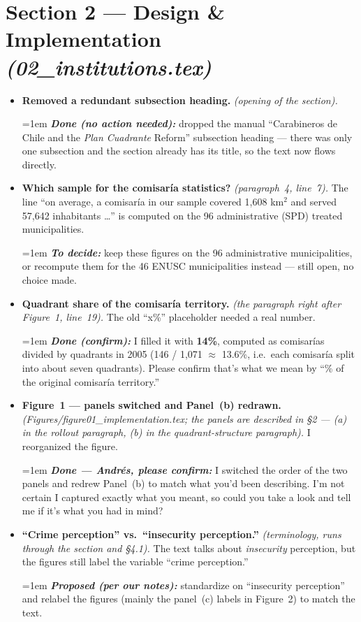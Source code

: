 \documentclass[11pt]{article}
\newcommand{\where}[1]{{\small\textit{#1}}}
\newcommand{\fix}[1]{\smallskip\par\hangindent=1em \textbf{\itshape #1}}
\begin{document}
\section*{Section 2 --- Design \& Implementation \where{(02\_institutions.tex)}}
\begin{itemize}
\item \textbf{Removed a redundant subsection heading.} \where{(opening of the section).}
\fix{Done (no action needed):} dropped the manual ``Carabineros de Chile and the \emph{Plan Cuadrante} Reform'' subsection heading --- there was only one subsection and the section already has its title, so the text now flows directly.
\item \textbf{Which sample for the comisar\'ia statistics?} \where{(paragraph~4, line~7).} The line ``on average, a comisar\'ia in our sample covered 1{,}608 km$^2$ and served 57{,}642 inhabitants \dots'' is computed on the 96 administrative (SPD) treated municipalities.
\fix{To decide:} keep these figures on the 96 administrative municipalities, or recompute them for the 46 ENUSC municipalities instead --- still open, no choice made.
\item \textbf{Quadrant share of the comisar\'ia territory.} \where{(the paragraph right after Figure~1, line~19).} The old ``x\%'' placeholder needed a real number.
\fix{Done (confirm):} I filled it with \textbf{14\%}, computed as comisar\'ias divided by quadrants in 2005 (146 / 1{,}071 $\approx$ 13.6\%, i.e.\ each comisar\'ia split into about seven quadrants). Please confirm that's what we mean by ``\% of the original comisar\'ia territory.''
\item \textbf{Figure~1 --- panels switched and Panel~(b) redrawn.} \where{(Figures/figure01\_implementation.tex; the panels are described in \S2 --- (a) in the rollout paragraph, (b) in the quadrant-structure paragraph).} I reorganized the figure.
\fix{Done --- Andr\'es, please confirm:} I switched the order of the two panels and redrew Panel~(b) to match what you'd been describing. I'm not certain I captured exactly what you meant, so could you take a look and tell me if it's what you had in mind?
\item \textbf{``Crime perception'' vs.\ ``insecurity perception.''} \where{(terminology, runs through the section and \S4.1).} The text talks about \emph{insecurity} perception, but the figures still label the variable ``crime perception.''
\fix{Proposed (per our notes):} standardize on ``insecurity perception'' and relabel the figures (mainly the panel~(c) labels in Figure~2) to match the text.
\end{itemize}
\end{document}
